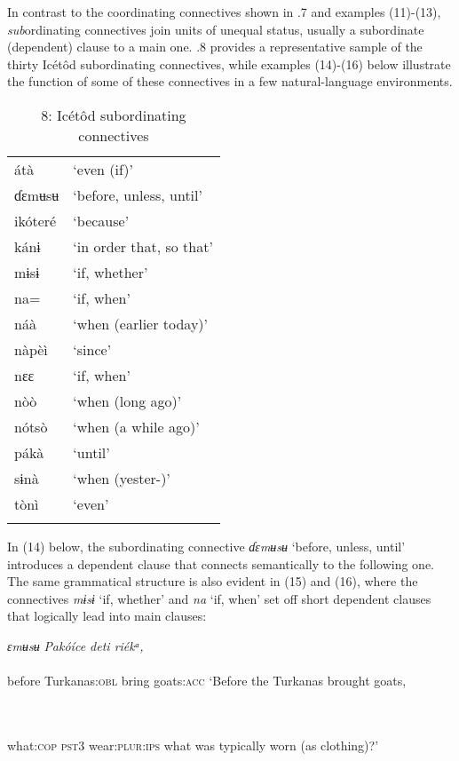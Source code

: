 In contrast to the coordinating connectives shown in .7 and examples (11)-(13), \textit{sub}ordinating connectives join units of unequal status, usually a subordinate (dependent) clause to a main one. .8 provides a representative sample of the thirty Icétôd subordinating connectives, while examples (14)-(16) below illustrate the function of some of these connectives in a few natural-language environments.


\begin{table}
\caption{8: Icétôd subordinating connectives}
\label{tab:3}


\begin{tabularx}{\textwidth}{XX}
\lsptoprule

átà & ‘even (if)’\\
ɗɛmʉsʉ & ‘before, unless, until’\\
ikóteré & ‘because’\\
kánɨ & ‘in order that, so that’\\
mɨsɨ & ‘if, whether’\\
na= & ‘if, when’\\
náà & ‘when (earlier today)’\\
nàpèì & ‘since’\\
nɛɛ & ‘if, when’\\
nòò & ‘when (long ago)’\\
nótsò & ‘when (a while ago)’\\
pákà & ‘until’\\
sɨnà & ‘when (yester-)’\\
tònì & ‘even’\\
\lspbottomrule
\end{tabularx}
\end{table}
In (14) below, the subordinating connective \textit{ɗɛmʉsʉ} ‘before, unless, until’ introduces a dependent clause that connects semantically to the following one. The same grammatical structure is also evident in (15) and (16), where the connectives \textit{mɨsɨ} ‘if, whether’ and \textit{na} ‘if, when’ set off short dependent clauses that logically lead into main clauses:



\ea\label{ex:}
\textit{ɛmʉsʉ}\textit{   Pakóíce     deti   riékᵃ,} \\
    \\
before   Turkanas:\textsc{obl}   bring   goats:\textsc{acc}
\glt ‘Before the Turkanas brought goats, 
\z



\ea\label{ex:}
 \\
    \\
what:\textsc{cop}   \textsc{pst3}   wear:\textsc{plur:ips}
\glt what was typically worn (as clothing)?’
\z  



